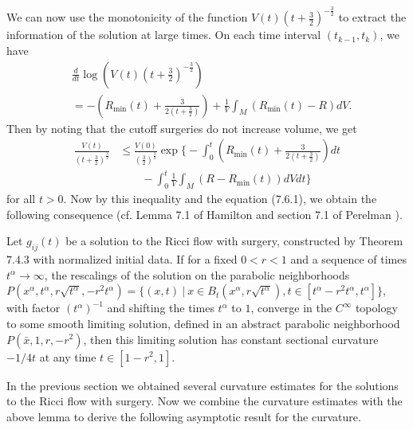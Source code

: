 We can now use the monotonicity of the function
$V(t)(t+\frac{3}{2})^{-\frac{3}{2}}$ to extract the information of
the solution at large times. On each time interval
$(t_{k-1},t_k)$, we have
\begin{align*}
&\frac{d}{dt}\log\left(V(t)\left(t+\frac{3}{2}\right)^{-\frac{3}{2}}\right) \\
&=-\left(R_{\min}(t)+\frac{3}{2\left(t+\frac{3}{2}\right)}\right)
+\frac{1}{V}\int_M(R_{\min}(t)-R)dV.
\end{align*}
Then by noting that the cutoff surgeries do not increase volume,
we get
\begin{align}
\frac{V(t)}{(t+\frac{3}{2})^{\frac{3}{2}}}
&\leq\frac{V(0)}{(\frac{3}{2})^{\frac{3}{2}}}
\exp\Bigg\{-\int^t_0\left(R_{\min}(t)
+\frac{3}{2(t+\frac{3}{2})}\right)dt \\
&\qquad-\int^t_0\frac{1}{V}
\int_M(R-R_{\min}(t))dVdt\Bigg\} \nonumber %
\end{align}
for all $t>0$. Now by this inequality and the equation (7.6.1), we
obtain the following consequence (cf. Lemma 7.1 of Hamilton
\cite{Ha99} and section 7.1 of Perelman \cite{P2}).

\begin{lemma}
  \label{lem:cz-parabolic-blowdown-flatness}

Let $g_{ij}(t)$ be a solution to the Ricci flow with surgery,
constructed by Theorem $7.4.3$ with normalized initial data. If for
a fixed $0<r<1$ and a sequence of times
$t^{\alpha}\rightarrow\infty$, the rescalings of the solution on the
parabolic neighborhoods
$P(x^{\alpha},t^{\alpha},r\sqrt{t^{\alpha}},-r^2t^{\alpha})=\{(x,t)\
|\ x\in B_t(x^{\alpha},r\sqrt{t^{\alpha}}),
t\in[t^{\alpha}-r^2t^{\alpha},t^{\alpha}]\}$, with factor
$(t^{\alpha})^{-1}$ and shifting the times $t^{\alpha}$ to $1$,
converge in the $C^{\infty}$ topology to some smooth limiting
solution, defined in an abstract parabolic neighborhood
$P(\bar{x},1,r,-r^2)$, then this limiting solution has constant
sectional curvature $-1/4t$ at any time $t\in [1-r^2,1]$.
\end{lemma}

In the previous section we obtained several curvature estimates
for the solutions to the Ricci flow with surgery. Now we combine
the curvature estimates with the above lemma to derive the
following asymptotic result for the curvature.


